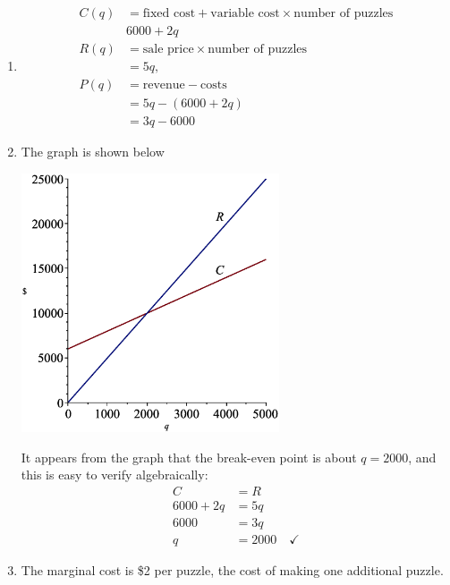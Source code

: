 \documentclass[oneside]{book}
\theoremstyle{definition}
\theoremstyle{solution}
\newtheorem*{solution}{Solution}
\newenvironment{solution}{\vspace{2in}\comment}{\endcomment}
\begin{document}
\begin{solution}
  \begin{enumerate}
  \item 
    \begin{align*}
      C(q)& = \text{fixed cost} + \text{variable cost}\times
            \text{number of puzzles}\\
          & 6000 + 2q\\
      R(q) &= \text{sale price}\times \text{number of puzzles}\\
          & = 5q,\\
      P(q) &= \text{revenue} - \text{costs}\\
          & = 5q-(6000 + 2q) \\
          & = 3q-6000
    \end{align*}

\item    
The graph is shown below
\begin{center}
\includegraphics[width=3in]{cost_and_revenue}
\end{center}
It appears from the graph that the break-even point is about
$q=2000$, and this is easy to verify algebraically:
\begin{align*}
C & = R\\
6000 + 2q & = 5q\\
6000 & = 3q\\
q & = 2000\quad  \checkmark
\end{align*}

\item The marginal cost is \$2 per puzzle, the cost of making one
  additional puzzle.  
\end{enumerate}
\end{solution}
\end{document}
